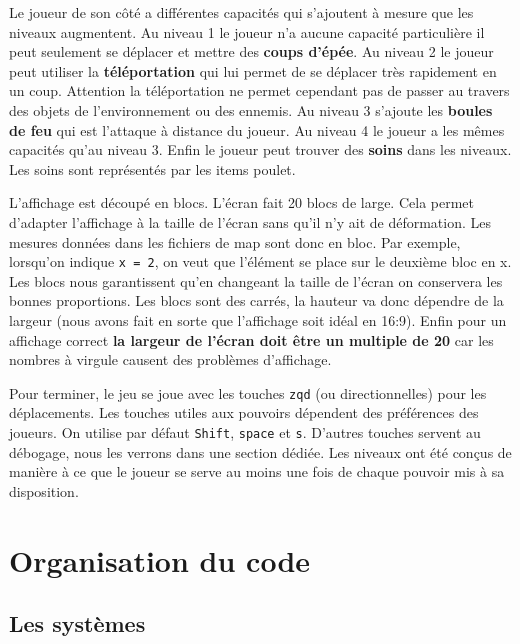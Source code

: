 \documentclass{article}
\begin{document}
Le joueur de son côté a différentes capacités qui s'ajoutent à mesure que les niveaux augmentent. Au niveau 1 le 
joueur n'a aucune capacité particulière il peut seulement se déplacer et mettre des \textbf{coups d'épée}. Au niveau 2 
le joueur peut utiliser la \textbf{téléportation} qui lui permet de se déplacer très rapidement en un coup. 
Attention la téléportation ne permet cependant pas de passer au travers des objets de l'environnement ou des 
ennemis. Au niveau 3 s'ajoute les \textbf{boules de feu} qui est l'attaque à distance du joueur. Au niveau 4 le 
joueur a les mêmes capacités qu'au niveau 3. Enfin le joueur peut trouver des \textbf{soins} dans les niveaux. 
Les soins sont représentés par les items poulet.

L'affichage est découpé en blocs. L'écran fait 20 blocs de large. Cela permet d'adapter l'affichage à la taille de 
l'écran sans qu'il n'y ait de déformation. Les mesures données dans les fichiers de map sont donc en bloc. 
Par exemple, lorsqu'on indique \verb|x = 2|, on veut que l'élément se place sur le deuxième bloc en x. Les blocs nous 
garantissent qu'en changeant la taille de l'écran on conservera les bonnes proportions. Les blocs sont des carrés,
 la hauteur va donc dépendre de la largeur (nous avons fait en sorte que l'affichage soit idéal en 16:9).
Enfin pour un affichage correct \textbf{la largeur de l'écran doit être un multiple de 20} car les nombres à 
virgule causent des problèmes d'affichage.

Pour terminer, le jeu se joue avec les touches \verb|zqd| (ou directionnelles) pour les déplacements. Les 
touches utiles aux pouvoirs dépendent des préférences des joueurs. On utilise par défaut \verb|Shift|, 
\verb|space| et \verb|s|. D'autres touches servent au débogage, nous les verrons dans une section dédiée. 
Les niveaux ont été conçus de manière à ce que le joueur se serve au moins une fois de chaque pouvoir 
mis à sa disposition.

\section{Organisation du code}

\subsection{Les systèmes}
\end{document}
